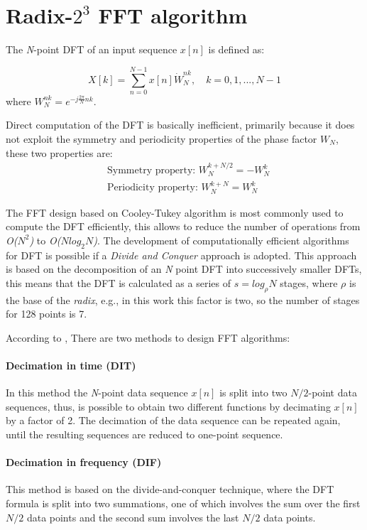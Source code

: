 \documentclass[journal,comsoc]{IEEEtran}
\begin{document}
 
\section{Radix-$2^3$ FFT algorithm} \label{sec:equa}
The \textit{N}-point DFT of an input sequence $x[n]$ is defined as:

\begin{equation}
	X[k] = \sum_{n=0}^{N-1} x[n] \dot W_N^{nk}, \quad k=0,1,...,N-1
\end{equation}
where $W_N^{nk} = e^{-j\frac{2\pi}{N} nk}$. 

Direct computation of the DFT is basically inefficient, primarily because it does not exploit the symmetry and periodicity properties of the phase factor $W_N$, these two properties are:
\begin{align}
	&\text{Symmetry property: } W_N^{k+N/2} = -W_N^k	\\
	&\text{Periodicity property: } W_N^{k+N} = W_N^k
\end{align}

The FFT design based on Cooley-Tukey algorithm is most commonly used to compute the DFT efficiently, this allows to reduce the number of operations from \textit{O($N^2$)} to \textit{O($Nlog_2N$)}. 
The development of computationally efficient algorithms for DFT is possible if a \textit{Divide and Conquer} approach is adopted. This approach is based on the decomposition of an \textit{N} point DFT into successively smaller DFTs, this means that the DFT is calculated as a series of $s=log_\rho N$ stages, where $\rho$ is the base of the \textit{radix}, e.g., in this work this factor is two, so the number of stages for 128 points is 7.

According to \cite{proakis_digital_nodate,oppenheim_tratamiento_2011}, There are two methods to design FFT algorithms: 
\paragraph{Decimation in time (DIT)}
In this method the \textit{N}-point data sequence $x[n]$ is split into two $N/2$-point data sequences, thus, is possible to obtain two different functions by decimating $x[n]$ by a factor of 2. The decimation of the data sequence can be repeated again, until the resulting sequences are reduced to one-point sequence. 
\paragraph{Decimation in frequency (DIF)}
This method is based on the divide-and-conquer technique, where the DFT formula is split into two summations, one of which involves the sum over the first $N/2$ data points and the second sum involves the last $N/2$ data points.
\end{document}
